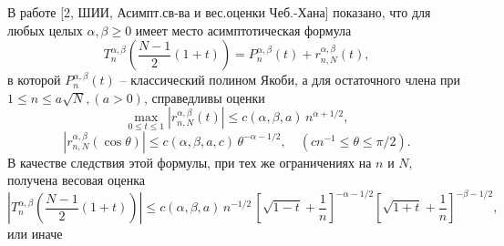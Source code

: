 \documentclass[12pt]{book}
\begin{document}
В работе [2, ШИИ, Асимпт.св-ва и вес.оценки Чеб.-Хана] показано, что для любых целых $\alpha,\beta \geq 0$ имеет место асимптотическая формула
\begin{equation}\label{asymptf}
 T_{n}^{\alpha,\beta}\left( \frac{N-1}{2}(1+t) \right) = P_{n}^{\alpha,\beta}(t)+r_{n,N}^{\alpha,\beta}(t),
\end{equation}
в которой $P_{n}^{\alpha,\beta}(t)$ -- классический полином Якоби, а для остаточного члена при $1 \leq n \leq a\sqrt{N}, (a>0)$, справедливы оценки
\begin{equation}\label{asymptRest1}
  \max\limits_{0\leq t \leq 1} |r_{n,N}^{\alpha,\beta}(t)| \leq c(\alpha,\beta,a)\,n^{\alpha+1/2},
\end{equation}
\begin{equation}\label{asymptRest1}
  |r_{n,N}^{\alpha,\beta}(\cos{\theta})| \leq c(\alpha,\beta,a,c)\,\theta^{-\alpha-1/2}, \quad \left( cn^{-1} \leq \theta \leq \pi/2\right).
\end{equation}
В качестве следствия этой формулы, при тех же ограничениях на $n$ и $N$, получена весовая оценка
\begin{equation}\label{weightEst}
  \left| T_{n}^{\alpha,\beta}\left(\frac{N-1}{2}(1+t)\right)\right| \leq
    c(\alpha,\beta,a)\,n^{-1/2}\,
    \left[  \sqrt{1-t} + \frac1n \right]^{-\alpha-1/2}
    \left[  \sqrt{1+t} + \frac1n \right]^{-\beta-1/2},
\end{equation}
или иначе
\end{document}
